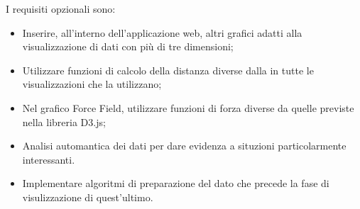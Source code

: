 \documentclass[../analisi-dei-requisiti.tex]{subfiles}
\begin{document}
\setlength{\parindent}{0pt}I requisiti opzionali sono:
\begin{itemize}
    \item Inserire, all'interno dell'applicazione web, altri grafici adatti alla visualizzazione di dati con più di tre dimensioni;
    \item Utilizzare funzioni di calcolo della distanza diverse dalla  in tutte le visualizzazioni che la utilizzano;
    \item Nel grafico Force Field, utilizzare funzioni di forza diverse da quelle previste nella libreria D3.js;
    \item Analisi automantica dei dati per dare evidenza a situzioni particolarmente interessanti.
    \item Implementare algoritmi di preparazione del dato che precede la fase di visulizzazione di quest'ultimo.
\end{itemize}
\end{document}
